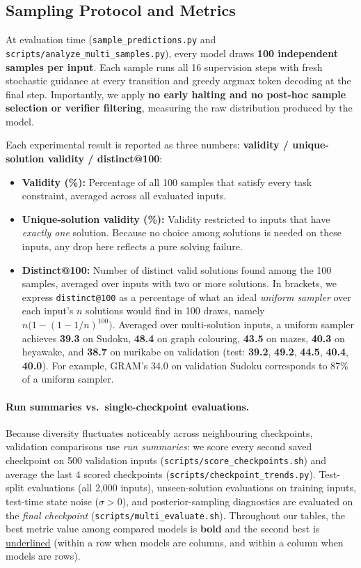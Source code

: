 \documentclass[11pt]{article}
\newcommand{\secbest}[1]{\underline{#1}}
\begin{document}
\subsection{Sampling Protocol and Metrics}
\label{sec:metrics}
{\sloppy At evaluation time (\texttt{sample\_predictions.py} and \texttt{scripts/analyze\_multi\_samples.py}), every model draws \textbf{100 independent samples per input}. Each sample runs all 16 supervision steps with fresh stochastic guidance at every transition and greedy argmax token decoding at the final step. Importantly, we apply \textbf{no early halting and no post-hoc sample selection or verifier filtering}, measuring the raw distribution produced by the model.\par}

Each experimental result is reported as three numbers: \textbf{validity / unique-solution validity / distinct@100}:
\begin{itemize}
  \item \textbf{Validity (\%):} Percentage of all 100 samples that satisfy every task constraint, averaged across all evaluated inputs.
  \item \textbf{Unique-solution validity (\%):} Validity restricted to inputs that have \emph{exactly one} solution. Because no choice among solutions is needed on these inputs, any drop here reflects a pure solving failure.
  \item \textbf{Distinct@100:} Number of distinct valid solutions found among the 100 samples, averaged over inputs with two or more solutions. In brackets, we express \texttt{distinct@100} as a percentage of what an ideal \emph{uniform sampler} over each input's $n$ solutions would find in 100 draws, namely $n\bigl(1 - (1 - 1/n)^{100}\bigr)$. Averaged over multi-solution inputs, a uniform sampler achieves \textbf{39.3} on Sudoku, \textbf{48.4} on graph colouring, \textbf{43.5} on mazes, \textbf{40.3} on heyawake, and \textbf{38.7} on nurikabe on validation (test: \textbf{39.2}, \textbf{49.2}, \textbf{44.5}, \textbf{40.4}, \textbf{40.0}). For example, GRAM's 34.0 on validation Sudoku corresponds to 87\% of a uniform sampler.
\end{itemize}

\paragraph{Run summaries vs.\ single-checkpoint evaluations.}
Because diversity fluctuates noticeably across neighbouring checkpoints, validation comparisons use \emph{run summaries}: we score every second saved checkpoint on 500 validation inputs (\texttt{scripts/score\_checkpoints.sh}) and average the last 4 scored checkpoints (\texttt{scripts/checkpoint\_trends.py}). Test-split evaluations (all 2,000 inputs), unseen-solution evaluations on training inputs, test-time state noise ($\sigma > 0$), and posterior-sampling diagnostics are evaluated on the \emph{final checkpoint} (\texttt{scripts/multi\_evaluate.sh}). Throughout our tables, the best metric value among compared models is \textbf{bold} and the second best is \secbest{underlined} (within a row when models are columns, and within a column when models are rows).
\end{document}
